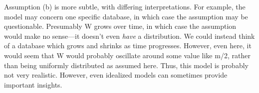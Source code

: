 \documentclass[11pt]{article}
\begin{document}
Assumption (b) is more subtle, with differing interpretations.  For
example, the model may concern one specific database, in which case the
assumption may be questionable.  Presumably W grows over time, in which
case the assumption would make no sense---it doesn't even {\it have} a
distribution.  We could instead think of a database which grows and
shrinks as time progresses.  However, even here, it would seem that W
would probably oscillate around some value like m/2, rather than being
uniformly distributed as assumed here.  Thus, this model is probably not
very realistic.  However, even idealized models can sometimes provide
important insights.

% 
% 
% 
% 
% 
% 
% 
% 
% 
% 
% 
% 
% 
\end{document}
